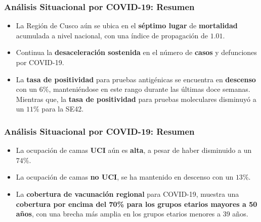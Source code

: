\documentclass[xcolor=table]{beamer}
\begin{document}
\begin{frame}[label=resumen]
	\frametitle{Análisis Situacional por COVID-19: Resumen}
	\vspace{-.5cm}
	\begin{itemize}
		\item La Región de Cusco aún se ubica en el \textbf{\color{mycolor4}séptimo lugar} de \textbf{\color{mycolor3}mortalidad} acumulada a nivel nacional, con una índice de propagación de $ 1.01 $.
		\item Continua la \textbf{\color{mycolor4}desaceleración sostenida} en el número de \textbf{\color{mycolor3}casos} y defunciones por COVID-19. 
		\item La \textbf{\color{mycolor3}tasa de positividad} para pruebas antigénicas se encuentra en \textbf{\color{mycolor4}descenso} con un $6\%$, manteniéndose en este rango durante las últimas doce semanas. Mientras que, la \textbf{\color{mycolor3}tasa de positividad} para pruebas moleculares disminuyó a un $11\%$ para la SE42.
		\end{itemize}
\end{frame}

\begin{frame}
	\frametitle{Análisis Situacional por COVID-19: Resumen}
	\vspace{-.5cm}
	\begin{itemize}
	\item La ocupación de camas \textbf{\color{mycolor3}UCI} aún es \textbf{\color{mycolor4} alta}, a pesar de haber disminuido a un $74\% $. 
	\item La ocupación de camas \textbf{\color{mycolor3}no UCI}, se ha mantenido en descenso con un $13\%$. \textbf{\color{mycolor4}} 
	\item La \textbf{\color{mycolor3}cobertura de vacunación regional} para COVID-19, muestra una \textbf{\color{mycolor4}cobertura por encima del 70\% para los grupos etarios mayores a 50 años}, con una brecha más amplia en los grupos etarios menores a 39 años.
	
	\end{itemize}
\end{frame}
\end{document}

